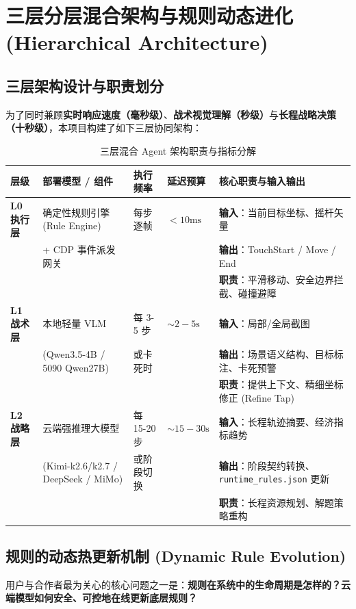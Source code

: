 \documentclass[11pt,a4paper]{ctexart}
\begin{document}
\newpage
\section{三层分层混合架构与规则动态进化 (Hierarchical Architecture)}

\subsection{三层架构设计与职责划分}
为了同时兼顾\textbf{实时响应速度（毫秒级）}、\textbf{战术视觉理解（秒级）}与\textbf{长程战略决策（十秒级）}，本项目构建了如下三层协同架构：

\begin{table}[htbp]
\centering
\small
\caption{三层混合 Agent 架构职责与指标分解}
\label{tab:three_tier}
\begin{tabular}{lp{2.8cm}lp{2.2cm}p{5.5cm}}
\toprule
\textbf{层级} & \textbf{部署模型 / 组件} & \textbf{执行频率} & \textbf{延迟预算} & \textbf{核心职责与输入输出} \\
\midrule
\textbf{L0 执行层} & 确定性规则引擎 (Rule Engine) & 每步逐帧 & $<10\text{ms}$ & \textbf{输入}：当前目标坐标、摇杆矢量\\
 & + CDP 事件派发网关 & & & \textbf{输出}：TouchStart / Move / End\\
 & & & & \textbf{职责}：平滑移动、安全边界拦截、碰撞避障 \\
\midrule
\textbf{L1 战术层} & 本地轻量 VLM & 每 3-5 步 & $\sim 2-5\text{s}$ & \textbf{输入}：局部/全局截图\\
 & (Qwen3.5-4B / 5090 Qwen27B) & 或卡死时 & & \textbf{输出}：场景语义结构、目标标注、卡死预警\\
 & & & & \textbf{职责}：提供上下文、精细坐标修正 (Refine Tap) \\
\midrule
\textbf{L2 战略层} & 云端强推理大模型 & 每 15-20 步 & $\sim 15-30\text{s}$ & \textbf{输入}：长程轨迹摘要、经济指标趋势\\
 & (Kimi-k2.6/k2.7 / DeepSeek / MiMo) & 或阶段切换 & & \textbf{输出}：阶段契约转换、\texttt{runtime\_rules.json} 更新\\
 & & & & \textbf{职责}：长程资源规划、解题策略重构 \\
\bottomrule
\end{tabular}
\end{table}

\subsection{规则的动态热更新机制 (Dynamic Rule Evolution)}
用户与合作者最为关心的核心问题之一是：\textbf{规则在系统中的生命周期是怎样的？云端模型如何安全、可控地在线更新底层规则？}
\end{document}
